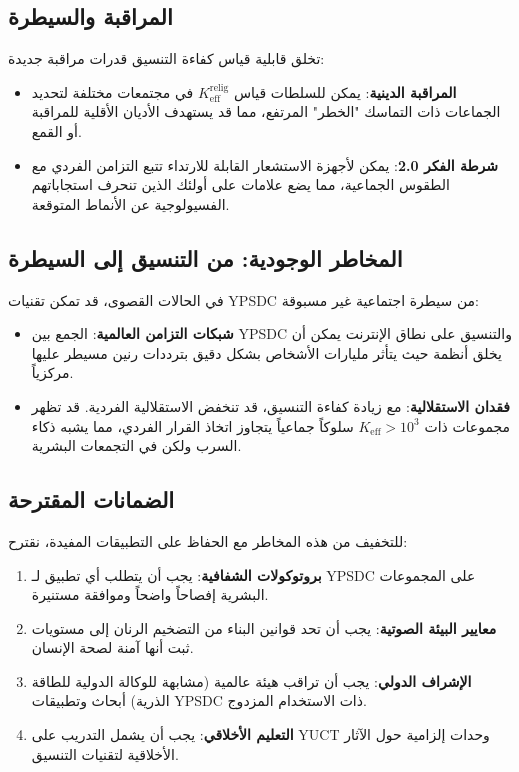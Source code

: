 \documentclass[12pt,a4paper]{article}
\begin{document}
	\subsection{المراقبة والسيطرة}
	
	تخلق قابلية قياس كفاءة التنسيق قدرات مراقبة جديدة:
	\begin{itemize}
		\item \textbf{المراقبة الدينية}: يمكن للسلطات قياس \(K_{\mathrm{eff}}^{\mathrm{relig}}\) في مجتمعات مختلفة لتحديد الجماعات ذات التماسك "الخطر" المرتفع، مما قد يستهدف الأديان الأقلية للمراقبة أو القمع.
		
		\item \textbf{شرطة الفكر 2.0}: يمكن لأجهزة الاستشعار القابلة للارتداء تتبع التزامن الفردي مع الطقوس الجماعية، مما يضع علامات على أولئك الذين تنحرف استجاباتهم الفسيولوجية عن الأنماط المتوقعة.
	\end{itemize}
	
	\subsection{المخاطر الوجودية: من التنسيق إلى السيطرة}
	
	في الحالات القصوى، قد تمكن تقنيات YPSDC من سيطرة اجتماعية غير مسبوقة:
	\begin{itemize}
		\item \textbf{شبكات التزامن العالمية}: الجمع بين YPSDC والتنسيق على نطاق الإنترنت يمكن أن يخلق أنظمة حيث يتأثر مليارات الأشخاص بشكل دقيق بترددات رنين مسيطر عليها مركزياً.
		
		\item \textbf{فقدان الاستقلالية}: مع زيادة كفاءة التنسيق، قد تنخفض الاستقلالية الفردية. قد تظهر مجموعات ذات \(K_{\mathrm{eff}} > 10^3\) سلوكاً جماعياً يتجاوز اتخاذ القرار الفردي، مما يشبه ذكاء السرب ولكن في التجمعات البشرية.
	\end{itemize}
	
	\subsection{الضمانات المقترحة}
	
	للتخفيف من هذه المخاطر مع الحفاظ على التطبيقات المفيدة، نقترح:
	\begin{enumerate}
		\item \textbf{بروتوكولات الشفافية}: يجب أن يتطلب أي تطبيق لـ YPSDC على المجموعات البشرية إفصاحاً واضحاً وموافقة مستنيرة.
		
		\item \textbf{معايير البيئة الصوتية}: يجب أن تحد قوانين البناء من التضخيم الرنان إلى مستويات ثبت أنها آمنة لصحة الإنسان.
		
		\item \textbf{الإشراف الدولي}: يجب أن تراقب هيئة عالمية (مشابهة للوكالة الدولية للطاقة الذرية) أبحاث وتطبيقات YPSDC ذات الاستخدام المزدوج.
		
		\item \textbf{التعليم الأخلاقي}: يجب أن يشمل التدريب على YUCT وحدات إلزامية حول الآثار الأخلاقية لتقنيات التنسيق.
	\end{enumerate}
	
\end{document}
